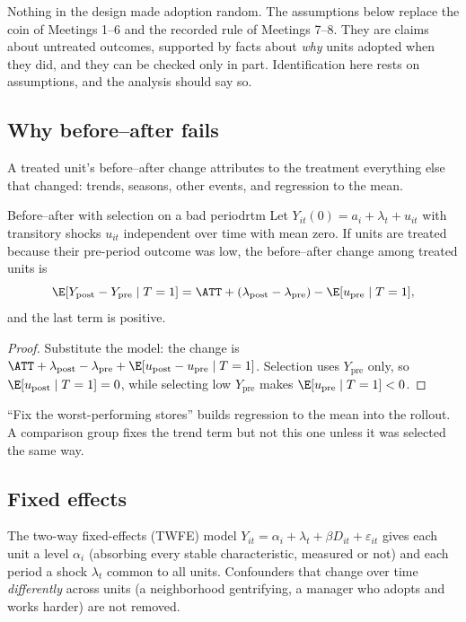 \documentclass[11pt]{article}
\begin{document}
Nothing in the design made adoption random. The assumptions below replace the coin of Meetings 1--6 and the recorded rule of
Meetings 7--8. They are claims about untreated outcomes, supported by facts about \emph{why} units adopted when they did, and
they can be checked only in part. Identification here rests on assumptions, and the analysis should say so.

\subsection{Why before--after fails}

A treated unit's before--after change attributes to the treatment everything else that changed: trends, seasons, other events,
and regression to the mean.

\begin{prop}{Before--after with selection on a bad period}{rtm}
Let $Y_{it}(0) = a_i + \lambda_t + u_{it}$ with transitory shocks $u_{it}$ independent over time with mean zero. If units are treated
because their pre-period outcome was low, the before--after change among treated units is
\[
  \E[Y_{\text{post}} - Y_{\text{pre}} \mid T = 1] = \ATT + (\lambda_{\text{post}} - \lambda_{\text{pre}}) - \E[u_{\text{pre}} \mid T = 1],
\]
and the last term is positive.
\end{prop}
\begin{proof}
Substitute the model: the change is $\ATT + \lambda_{\text{post}} - \lambda_{\text{pre}} + \E[u_{\text{post}} - u_{\text{pre}} \mid T=1]$. Selection uses
$Y_{\text{pre}}$ only, so $\E[u_{\text{post}} \mid T=1] = 0$, while selecting low $Y_{\text{pre}}$ makes $\E[u_{\text{pre}} \mid T=1] < 0$.
\end{proof}

``Fix the worst-performing stores'' builds regression to the mean into the rollout. A comparison group fixes the trend term but not this
one unless it was selected the same way.

\subsection{Fixed effects}

The two-way fixed-effects (TWFE) model $Y_{it} = \alpha_i + \lambda_t + \beta D_{it} + \varepsilon_{it}$ gives each unit a level $\alpha_i$ (absorbing every
stable characteristic, measured or not) and each period a shock $\lambda_t$ common to all units. Confounders that change over time
\emph{differently} across units (a neighborhood gentrifying, a manager who adopts and works harder) are not removed.
\end{document}
